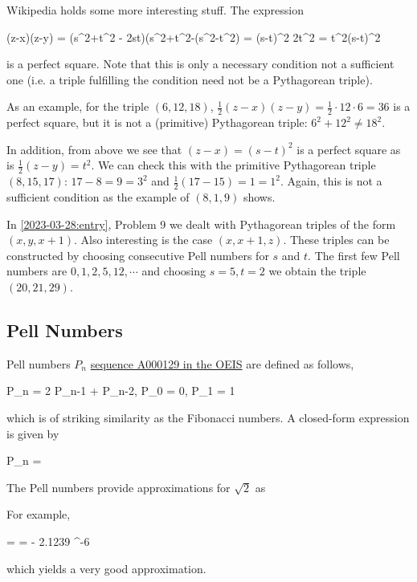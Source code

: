 Wikipedia holds some more interesting stuff. The expression

\bee
{}(z-x)(z-y) = (s^2+t^2 - 2st)(s^2+t^2-(s^2-t^2) =  (s-t)^2 2t^2 = t^2(s-t)^2
\eee

is a perfect square. Note that this is only a necessary condition not a sufficient one (i.e. a triple fulfilling the condition need not be a Pythagorean triple).

As an example, for the triple $(6, 12, 18)$, $\frac{1}{2}(z-x)(z-y) = \frac{1}{2} \cdot 12 \cdot 6 = 36$ is a perfect square, but it is not a (primitive) Pythagorean triple: $6^2 + 12^2 \neq 18^2$.

In addition, from above we see that $(z-x) = (s-t)^2$ is a perfect square as is $\frac{1}{2}(z-y) = t^2$. We can check this with the primitive Pythagorean triple $(8, 15, 17)$: $17 - 8 = 9 = 3^2$ and $\frac{1}{2} (17-15) = 1 = 1^2$. Again, this is not a sufficient condition as the example of $(8, 1, 9)$ shows.

In \ref{2023-03-28:entry}, Problem 9 we dealt with Pythagorean triples of the form $(x, y, x+1)$. Also interesting is the case $(x, x+1, z)$. These triples can be constructed by choosing consecutive Pell numbers for $s$ and $t$. The first few Pell numbers are $0, 1, 2, 5, 12, \cdots$ and choosing $s = 5, t=2$ we obtain the triple $(20, 21, 29)$.

\subsection{Pell Numbers}

Pell numbers $P_n$ \href{https://oeis.org/A000129}{sequence A000129 in the OEIS} are defined as follows,

\bee
P_n = 2 P_{n-1} + P_{n-2}, \quad P_0 = 0, P_1 = 1
\eee

which is of striking similarity as the Fibonacci numbers. A closed-form expression is given by

\bee
P_n = 
\eee

The Pell numbers provide approximations for $\sqrt{2}$ as

\bee
{} \approx {}
\eee

For example, 

\bee
{} =   =  - 2.1239 ^{-6}
\eee

which yields a very good approximation.

